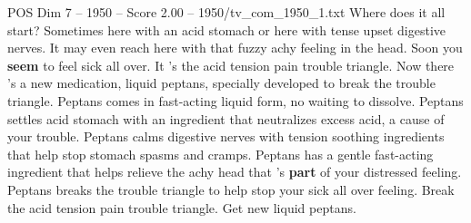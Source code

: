 \begin{textsample}{POS Dim 7 – 1950 – Score 2.00 – 1950/tv\_com\_1950\_1.txt}  \label{ex:f7_pos_009}
Where does it all start?
Sometimes here with an acid stomach or here with tense upset digestive nerves.
It may even reach here with that fuzzy achy feeling in the head.
Soon you \textbf{seem} to feel sick all over.
It 's the acid tension pain trouble triangle.
Now there 's a new medication, liquid peptans, specially developed to break the trouble triangle.
Peptans comes in fast-acting liquid form, no waiting to dissolve.
Peptans settles acid stomach with an ingredient that neutralizes excess acid, a cause of your trouble.
Peptans calms digestive nerves with tension soothing ingredients that help stop stomach spasms and cramps.
Peptans has a gentle fast-acting ingredient that helps relieve the achy head that 's \textbf{part} of your distressed feeling.
Peptans breaks the trouble triangle to help stop your sick all over feeling.
Break the acid tension pain trouble triangle.
Get new liquid peptans.

\end{textsample}
